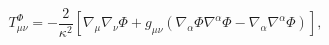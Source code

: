 \begin{equation}\label{tmnd}
T^{\Phi}_{\mu\nu}=-\frac{2}{\kappa^{2}}
\left[\nabla_\mu\nabla_\nu\Phi
+g_{\mu\nu}\left(\nabla_\alpha\Phi\nabla^\alpha\Phi
-\nabla_\alpha\nabla^\alpha\Phi\right)\right],
\end{equation}

